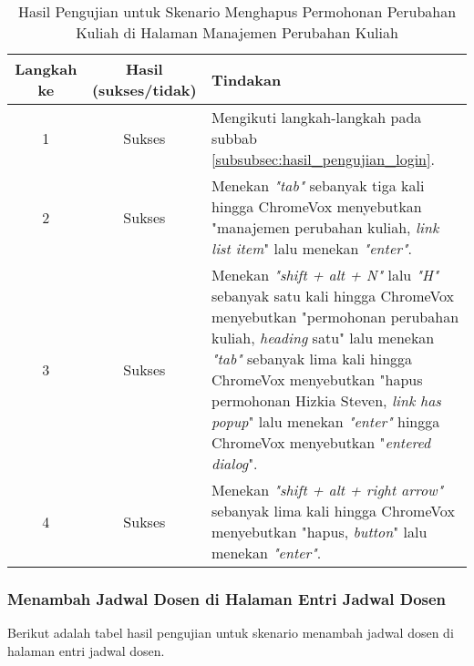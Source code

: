 \begin{table}[H]
    \centering 
    \caption{Hasil Pengujian untuk Skenario Menghapus Permohonan Perubahan Kuliah di Halaman Manajemen Perubahan Kuliah}
    \label{tab:hasil_pengujian_menghapus_permohonan_perubahan_kuliah_di_halaman_manajemen_perubahan_kuliah}
    \begin{tabular}{|c|c|p{10cm}|}
        \toprule
        Langkah ke & Hasil (sukses/tidak) & Tindakan \\

        \midrule
        1 & Sukses & Mengikuti langkah-langkah pada subbab \ref{subsubsec:hasil_pengujian_login}. \\
        2 & Sukses & Menekan \textit{"tab"} sebanyak tiga kali hingga ChromeVox menyebutkan "manajemen perubahan kuliah, \textit{link list item}" lalu menekan \textit{"enter"}. \\
        3 & Sukses & Menekan \textit{"shift + alt + N"} lalu \textit{"H"} sebanyak satu kali hingga ChromeVox menyebutkan "permohonan perubahan kuliah, \textit{heading} satu" lalu menekan \textit{"tab"} sebanyak lima kali hingga ChromeVox menyebutkan "hapus permohonan Hizkia Steven, \textit{link has popup}" lalu menekan \textit{"enter"} hingga ChromeVox menyebutkan "\textit{entered dialog}". \\
        4 & Sukses & Menekan \textit{"shift + alt + right arrow"} sebanyak lima kali hingga ChromeVox menyebutkan "hapus, \textit{button}" lalu menekan \textit{"enter"}. \\ 

        \bottomrule

    \end{tabular}
\end{table}

\subsubsection{Menambah Jadwal Dosen di Halaman Entri Jadwal Dosen}
\label{subsubsec:hasil_pengujian_menambah_jadwal_dosen_di_halaman_entri_jadwal_dosen}
Berikut adalah tabel hasil pengujian untuk skenario menambah jadwal dosen di halaman entri jadwal dosen.

